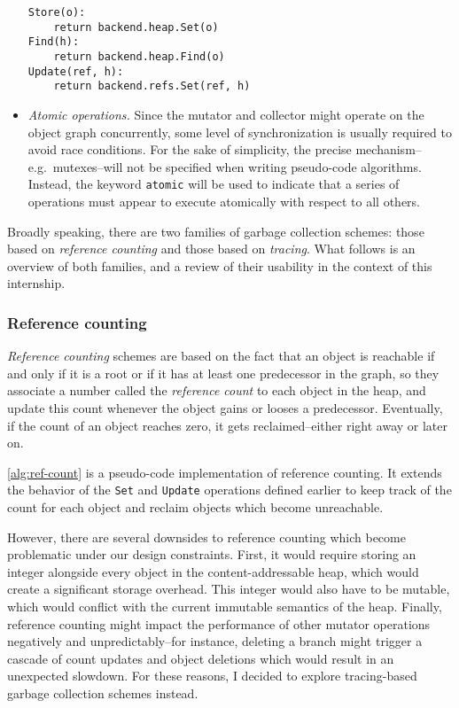 \begin{itemize}
        \begin{verbatim}
Store(o):
    return backend.heap.Set(o)
Find(h):
    return backend.heap.Find(o)
Update(ref, h):
    return backend.refs.Set(ref, h)
\end{verbatim}

  \item\emph{Atomic operations.}
        Since the mutator and collector might operate on the object graph concurrently, some level of synchronization is usually required to avoid race conditions. For the sake of simplicity, the precise mechanism--e.g.~mutexes--will not be specified when writing pseudo-code algorithms. Instead, the keyword \texttt{atomic} will be used to indicate that a series of operations must appear to execute atomically with respect to all others.

\end{itemize}

Broadly speaking, there are two families of garbage collection schemes: those based on \emph{reference counting} and those based on \emph{tracing}. What follows is an overview of both families, and a review of their usability in the context of this internship.

\subsubsection{Reference counting}

\emph{Reference counting} schemes are based on the fact that an object is reachable if and only if it is a root or if it has at least one predecessor in the graph, so they associate a number called the \emph{reference count} to each object in the heap, and update this count whenever the object gains or looses a predecessor. Eventually, if the count of an object reaches zero, it gets reclaimed--either right away or later on.

\cref{alg:ref-count} is a pseudo-code implementation of reference counting. It extends the behavior of the \texttt{Set} and \texttt{Update} operations defined earlier to keep track of the count for each object and reclaim objects which become unreachable.



However, there are several downsides to reference counting which become problematic under our design constraints. First, it would require storing an integer alongside every object in the content-addressable heap, which would create a significant storage overhead. This integer would also have to be mutable, which would conflict with the current immutable semantics of the heap. Finally, reference counting might impact the performance of other mutator operations negatively and unpredictably--for instance, deleting a branch might trigger a cascade of count updates and object deletions which would result in an unexpected slowdown. For these reasons, I decided to explore tracing-based garbage collection schemes instead.

